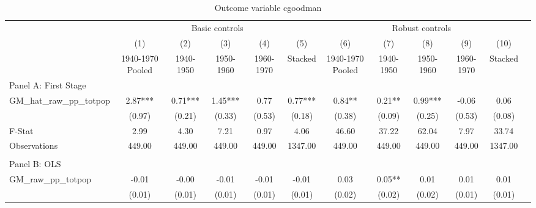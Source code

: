  \begin{table}[htbp]\centering {} \begin{threeparttable} \caption{Outcome variable cgoodman} \begin{tabular}{l*{11}{c}} \toprule
          &\multicolumn{5}{c}{Basic controls}                                   &\multicolumn{5}{c}{Robust controls}                                  \\\cmidrule(lr){2-6}\cmidrule(lr){7-11}
          &\multicolumn{1}{c}{(1)}&\multicolumn{1}{c}{(2)}&\multicolumn{1}{c}{(3)}&\multicolumn{1}{c}{(4)}&\multicolumn{1}{c}{(5)}&\multicolumn{1}{c}{(6)}&\multicolumn{1}{c}{(7)}&\multicolumn{1}{c}{(8)}&\multicolumn{1}{c}{(9)}&\multicolumn{1}{c}{(10)}\\
          &\multicolumn{1}{c}{1940-1970 Pooled}&\multicolumn{1}{c}{1940-1950}&\multicolumn{1}{c}{1950-1960}&\multicolumn{1}{c}{1960-1970}&\multicolumn{1}{c}{Stacked}&\multicolumn{1}{c}{1940-1970 Pooled}&\multicolumn{1}{c}{1940-1950}&\multicolumn{1}{c}{1950-1960}&\multicolumn{1}{c}{1960-1970}&\multicolumn{1}{c}{Stacked}\\
\cmidrule(lr){1-11}
\multicolumn{10}{l}{Panel A: First Stage}\\
\cmidrule(lr){1-11}
GM\_hat\_raw\_pp\_totpop&      2.87***&      0.71***&      1.45***&      0.77   &      0.77***&      0.84** &      0.21** &      0.99***&     -0.06   &      0.06   \\
          &    (0.97)   &    (0.21)   &    (0.33)   &    (0.53)   &    (0.18)   &    (0.38)   &    (0.09)   &    (0.25)   &    (0.53)   &    (0.08)   \\
\midrule
F-Stat    &      2.99   &      4.30   &      7.21   &      0.97   &      4.06   &     46.60   &     37.22   &     62.04   &      7.97   &     33.74   \\
Observations&    449.00   &    449.00   &    449.00   &    449.00   &   1347.00   &    449.00   &    449.00   &    449.00   &    449.00   &   1347.00   \\
\cmidrule[\heavyrulewidth](lr){1-11} \\ \cmidrule[\heavyrulewidth](lr){1-11}
\multicolumn{10}{l}{Panel B: OLS}\\
\cmidrule(lr){1-11}
GM\_raw\_pp\_totpop&     -0.01   &     -0.00   &     -0.01   &     -0.01   &     -0.01   &      0.03   &      0.05** &      0.01   &      0.01   &      0.01   \\
          &    (0.01)   &    (0.01)   &    (0.01)   &    (0.01)   &    (0.01)   &    (0.02)   &    (0.02)   &    (0.02)   &    (0.01)   &    (0.01)   \\

\end{tabular}
\end{threeparttable}
\end{table}
